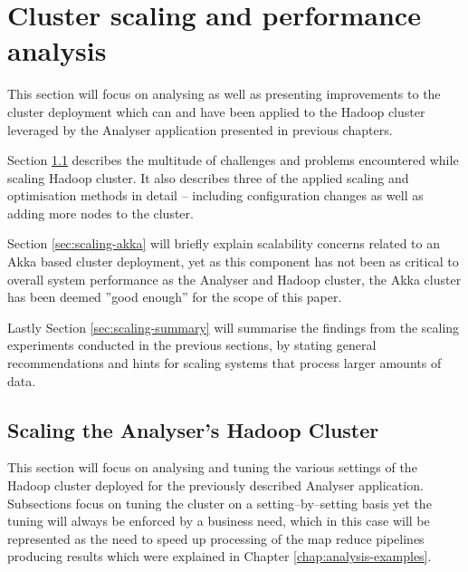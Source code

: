 \chapter{Cluster scaling and performance analysis}
\label{chap:perf-scalability}

This section will focus on analysing as well as presenting improvements to the cluster deployment which can and have been applied to the Hadoop cluster leveraged by the Analyser application presented in previous chapters.

Section \ref{sec:scaling-hadoop} describes the multitude of challenges and problems encountered while scaling Hadoop cluster. It also describes three of the applied scaling and optimisation methods in detail -- including configuration changes as well as adding more nodes to the cluster.


Section \ref{sec:scaling-akka} will briefly explain scalability concerns related to an Akka based cluster deployment, yet as this component has not been as critical to overall system performance as the Analyser and Hadoop cluster, the Akka cluster has been deemed ''good enough'' for the scope of this paper.

Lastly Section \ref{sec:scaling-summary} will summarise the findings from the scaling experiments conducted in the previous sections, by stating general recommendations and hints for scaling systems that process larger amounts of data.

\section{Scaling the Analyser's Hadoop Cluster}
\label{sec:scaling-hadoop}
This section will focus on analysing and tuning the various settings of the Hadoop cluster deployed for the previously described Analyser application. Subsections focus on tuning the cluster on a setting--by--setting basis yet the tuning will always be enforced by a business need, which in this case will be represented as the need to speed up processing of the map reduce pipelines producing results which were explained in Chapter \ref{chap:analysis-examples}.

